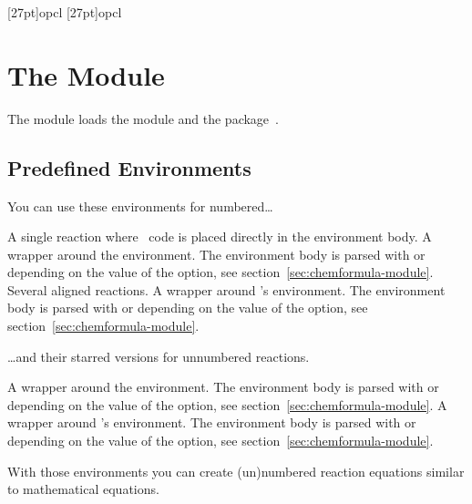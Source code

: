 \documentclass{chemmacros-manual}
\begin{document}
\begin{example}
  \makepolymerdelims{5pt}[27pt]{op}{cl}
  \makepolymerdelims[delimiters=()]{5pt}[27pt]{op}{cl}
\end{example}

\section{The  Module}\label{sec:reactions-module}
The  module loads the  module
and the  package~\cite{pkg:mathtools}.

\subsection{Predefined Environments}

You can use these environments for numbered\ldots
\begin{environments}
    A single reaction where \chemformula\ code is placed directly in the
    environment body.  A wrapper around the  environment.  The
    environment body is parsed with  or  depending on the value
    of the  option, see
    section~\vref{sec:chemformula-module}.
    Several aligned reactions.  A wrapper around 's 
    environment.  The environment body is parsed with  or 
    depending on the value of the  option, see
    section~\vref{sec:chemformula-module}.
\end{environments}

\ldots and their starred versions for unnumbered reactions.
\begin{environments}
    A wrapper around the  environment.  The environment body
    is parsed with  or  depending on the value of the
     option, see section~\vref{sec:chemformula-module}.
    A wrapper around 's  environment.  The
    environment body is parsed with  or  depending on the value
    of the  option, see
    section~\vref{sec:chemformula-module}.
\end{environments}

With those environments you can create (un)numbered reaction equations similar
to mathematical equations.
\end{document}

